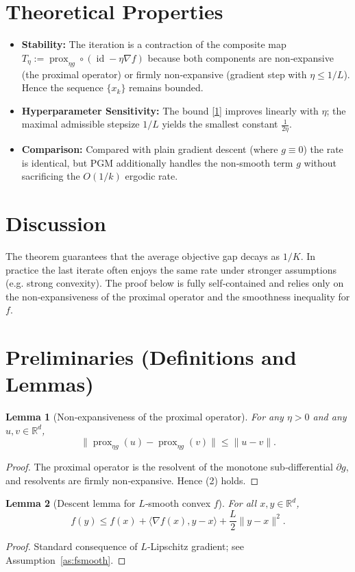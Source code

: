 \documentclass{article}
\newtheorem{lemma}{Lemma}
\newcommand{\prox}{\operatorname{prox}}
\newcommand{\grad}{\nabla}
\newcommand{\inner}[2]{\langle #1,#2\rangle}
\newcommand{\norm}[1]{\|#1\|}
\begin{document}
\section*{Theoretical Properties}
\begin{itemize}
    \item \textbf{Stability:} The iteration is a contraction of the composite map
    $T_{\eta}:= \prox_{\eta g}\circ(\operatorname{id}-\eta\grad f)$ because both components are non‑expansive (the proximal operator) or firmly non‑expansive (gradient step with $\eta\le1/L$). Hence the sequence $\{x_{k}\}$ remains bounded.
    \item \textbf{Hyperparameter Sensitivity:} The bound \eqref{1} improves linearly with $\eta$; the maximal admissible stepsize $1/L$ yields the smallest constant $\frac{1}{2\eta}$.
    \item \textbf{Comparison:} Compared with plain gradient descent (where $g\equiv0$) the rate is identical, but PGM additionally handles the non‑smooth term $g$ without sacrificing the $O(1/k)$ ergodic rate.
\end{itemize}

\section*{Discussion}
The theorem guarantees that the average objective gap decays as $1/K$. In practice the last iterate often enjoys the same rate under stronger assumptions (e.g. strong convexity). The proof below is fully self‑contained and relies only on the non‑expansiveness of the proximal operator and the smoothness inequality for $f$.

\newpage
\section*{Preliminaries (Definitions and Lemmas)}
\begin{lemma}[Non‑expansiveness of the proximal operator]\label{lem:prox_ne}
For any $\eta>0$ and any $u,v\in\mathbb R^{d}$,
\[
\norm{\prox_{\eta g}(u)-\prox_{\eta g}(v)}\le\norm{u-v}.
\tag{2}
\]
\end{lemma}
\begin{proof}
The proximal operator is the resolvent of the monotone sub‑differential $\partial g$, and resolvents are firmly non‑expansive. Hence (2) holds. \qedhere
\end{proof}

\begin{lemma}[Descent lemma for $L$‑smooth convex $f$]\label{lem:descent}
For all $x,y\in\mathbb R^{d}$,
\[
f(y)\le f(x)+\inner{\grad f(x)}{y-x}+\frac{L}{2}\norm{y-x}^{2}.
\tag{3}
\]
\end{lemma}
\begin{proof}
Standard consequence of $L$‑Lipschitz gradient; see Assumption~\ref{as:fsmooth}. \qedhere
\end{proof}
\end{document}
